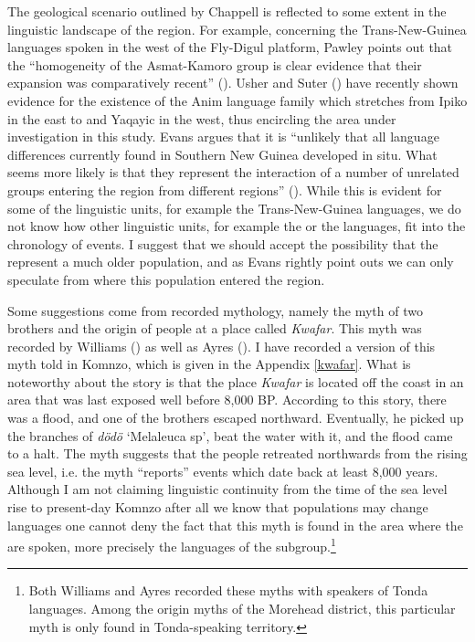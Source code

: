 The geological scenario outlined by Chappell is reflected to some extent in the linguistic landscape of the region. For example, concerning the Trans-New-Guinea languages spoken in the west of the Fly-Digul platform, Pawley points out that the ``homogeneity of the Asmat-Kamoro group is clear evidence that their expansion was comparatively recent'' (\citeyear[10]{Pawley:2005intro}). Usher and Suter (\citeyear{Usher:2015kr}) have recently shown evidence for the existence of the Anim language family which stretches from Ipiko in the east to  and Yaqayic in the west, thus encircling the area under investigation in this study. Evans argues that it is ``unlikely that all language differences currently found in Southern New Guinea developed in situ. What seems more likely is that they represent the interaction of a number of unrelated groups entering the region from different regions'' (\citeyear[111]{Evans:2012wp}). While this is evident for some of the linguistic units, for example the Trans-New-Guinea languages, we do not know how other linguistic units, for example the  or the  languages, fit into the chronology of events. I suggest that we should accept the possibility that the  represent a much older population, and {\textendash} as Evans rightly point outs {\textendash} we can only speculate from where this population entered the region.

Some suggestions come from recorded mythology, namely the myth of two brothers and the origin of people at a place called \emph{Kwafar}. This myth was recorded by Williams (\citeyear[306]{Williams:1936transfly}) as well as Ayres (\citeyear[50]{Ayres:ws}). I have recorded a version of this myth told in Komnzo, which is given in the Appendix \ref{kwafar}. What is noteworthy about the story is that the place \emph{Kwafar} is located off the coast in an area that was last exposed well before 8,000 BP. According to this story, there was a flood, and one of the brothers escaped northward. Eventually, he picked up the branches of \emph{dödö} `Melaleuca sp', beat the water with it, and the flood came to a halt. The myth suggests that the people retreated northwards from the rising sea level, i.e. the myth ``reports'' events which date back at least 8,000 years. Although I am not claiming linguistic continuity from the time of the sea level rise to present-day Komnzo {\textendash} after all we know that populations may change languages {\textendash} one cannot deny the fact that this myth is found in the area where the  are spoken, more precisely the languages of the  subgroup.\footnote{Both Williams and Ayres recorded these myths with speakers of Tonda languages. Among the origin myths of the Morehead district, this particular myth is only found in Tonda-speaking territory.}


